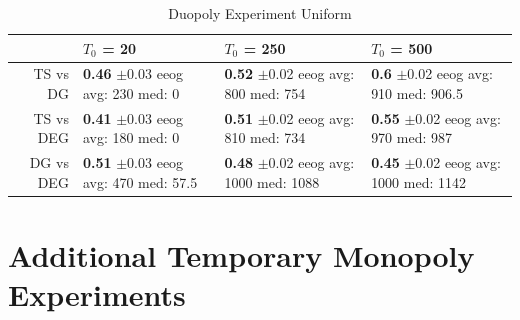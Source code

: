 \documentclass[11pt,letterpaper]{article}
\begin{document}
\begin{table}[H]
\centering
\caption{Duopoly Experiment Uniform} 
\begin{tabular}{rlll}
  \hline
 & $T_0$ = 20 & $T_0$ = 250 & $T_0$ = 500 \\ 
  \hline
TS vs DG & \makecell{\textbf{0.46} $\pm$0.03\\ eeog \\ avg: 230\\ med: 0} & \makecell{\textbf{0.52} $\pm$0.02\\ eeog \\ avg: 800\\ med: 754} & \makecell{\textbf{0.6} $\pm$0.02\\ eeog \\ avg: 910\\ med: 906.5} \\ 
  TS vs DEG & \makecell{\textbf{0.41} $\pm$0.03\\ eeog \\ avg: 180\\ med: 0} & \makecell{\textbf{0.51} $\pm$0.02\\ eeog \\ avg: 810\\ med: 734} & \makecell{\textbf{0.55} $\pm$0.02\\ eeog \\ avg: 970\\ med: 987} \\ 
  DG vs DEG & \makecell{\textbf{0.51} $\pm$0.03\\ eeog \\ avg: 470\\ med: 57.5} & \makecell{\textbf{0.48} $\pm$0.02\\ eeog \\ avg: 1000\\ med: 1088} & \makecell{\textbf{0.45} $\pm$0.02\\ eeog \\ avg: 1000\\ med: 1142} \\ 
   \hline
\end{tabular}
\end{table}

\newpage

\section{Additional Temporary Monopoly Experiments}
\end{document}
